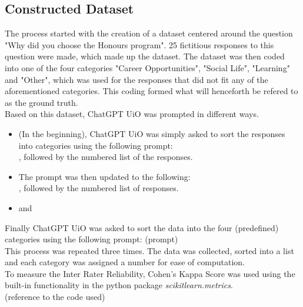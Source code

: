 \subsection{Constructed Dataset}
\begin{flushleft}
The process started with the creation of a dataset centered around the question "Why did you choose the Honours program". 25 fictitious responses to this question were made, which made up the dataset. 
The dataset was then coded into one of the four categories "Career Opportunities", "Social Life", "Learning" and "Other", which was used for the responses that did not fit any of the aforementioned categories.
This coding formed what will henceforth be refered to as the ground truth.\\
Based on this dataset, ChatGPT UiO was prompted in different ways. \\
\begin{itemize}
    \item (In the beginning), ChatGPT UiO was simply asked to sort the responses into categories using the following prompt: \\[5pt]
    , followed by the numbered list of the responses.\\
    \item The prompt was then updated to the following:\\[5pt]
    , followed by the numbered list of responses.
    \item and \\
\end{itemize}
Finally ChatGPT UiO was asked to sort the data into the four (predefined) categories using the following prompt: (prompt)\\
This process was repeated three times. The data was collected, sorted into a list and each category was assigned
a number for ease of computation.\\[10pt]

To measure the Inter Rater Reliability, Cohen's Kappa Score was used using the built-in functionality in the python package \textit{scikitlearn.metrics}.\\
(reference to the code used)\\[10pt]


\end{flushleft}
